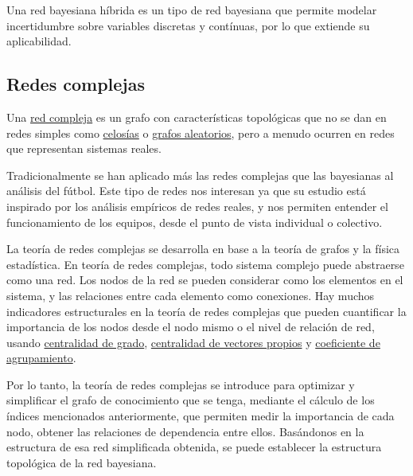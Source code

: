 \begin{definicion}\label{def:hybrid_BN}
Una red bayesiana híbrida\cite{hybrid-BN} es un tipo de red bayesiana que permite modelar incertidumbre
sobre variables discretas y contínuas, por lo que extiende su aplicabilidad.
\end{definicion}

\subsection{Redes complejas}
\begin{definicion}\label{def:CN}
    Una \href{https://en.wikipedia.org/wiki/Complex_network}{red compleja} 
    es un grafo con características topológicas que no se dan 
    en redes simples como \href{https://en.wikipedia.org/wiki/Lattice_(order)}{celosías} o 
    \href{https://mathworld.wolfram.com/RandomGraph.html}{grafos aleatorios}, pero a menudo ocurren en redes que 
    representan sistemas reales. 
\end{definicion}

Tradicionalmente se han aplicado más las redes complejas que las bayesianas al análisis del fútbol.\cite{ARRIAZAARDILES2018236}
Este tipo de redes nos interesan ya que su estudio está inspirado por los análisis empíricos de redes reales, y 
nos permiten entender el funcionamiento de los equipos, desde el punto de vista individual o colectivo.

La teoría de redes complejas se desarrolla en base a la teoría de grafos y la física estadística. En teoría de 
redes complejas, todo sistema complejo puede abstraerse como una red. Los nodos de la red se pueden 
considerar como los elementos en el sistema, y las relaciones
entre cada elemento como conexiones. Hay muchos indicadores estructurales
en la teoría de redes complejas que pueden cuantificar la importancia de los nodos desde el nodo mismo o el
nivel de relación de red, usando \href{https://link.springer.com/10.1007%2F978-1-4419-9863-7_935}{centralidad de grado}, 
\href{https://neo4j.com/docs/graph-data-science/current/algorithms/eigenvector-centrality/}{centralidad de vectores propios} 
y \href{https://en.wikipedia.org/wiki/Clustering_coefficient}{coeficiente de agrupamiento}.
 
Por lo tanto, la teoría de redes complejas se introduce para optimizar y simplificar el grafo de conocimiento que 
se tenga, mediante el cálculo de los índices mencionados anteriormente, que permiten medir la importancia de cada nodo, obtener 
las relaciones de dependencia entre ellos. Basándonos en la estructura de esa red simplificada obtenida, se puede establecer la estructura topológica de la red bayesiana. 
\cite{Bai_Xing_Wu_2022}

